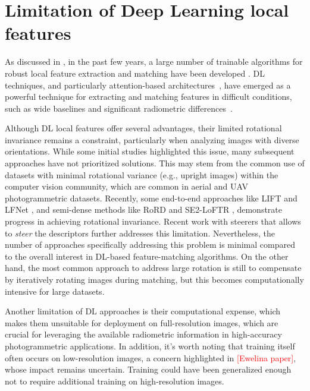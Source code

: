 
\section{Limitation of Deep Learning local features}\label{sec:5:limitation_dl_feats}

As discussed in , in the past few years, a large number of trainable algorithms for robust local feature extraction and matching have been developed \citep{Yao_2021, remondino2022_at_with_dl}.
DL techniques, and particularly attention-based architectures~\citep{vaswani2023attention}, have emerged as a powerful technique for extracting and matching features in difficult conditions, such as wide baselines and significant radiometric differences~\citep{jin_image_2021, Yao_2021}.

Although DL local features offer several advantages, their limited rotational invariance remains a constraint, particularly when analyzing images with diverse orientations. 
While some initial studies highlighted this issue, many subsequent approaches have not prioritized solutions. 
This may stem from the common use of datasets with minimal rotational variance (e.g., upright images) within the computer vision community, which are common in aerial and UAV photogrammetric datasets. 
Recently, some end-to-end approaches like LIFT \citep{yi2016lift} and LFNet \citep{ono2018lfnet}, and semi-dense methods like RoRD \citep{parihar2022rord} and SE2-LoFTR \citep{Bkman2022_se2loftr}, demonstrate progress in achieving rotational invariance. 
Recent work with steerers \citep{Wu2018_steerer} that allows to \textit{steer} the descriptors further addresses this limitation.
Nevertheless, the number of approaches specifically addressing this problem is minimal compared to the overall interest in DL-based feature-matching algorithms.
On the other hand, the most common approach to address large rotation is still to compensate by iteratively rotating images during matching, but this becomes computationally intensive for large datasets.

Another limitation of DL approaches is their computational expense, which makes them unsuitable for deployment on full-resolution images, which are crucial for leveraging the available radiometric information in high-accuracy photogrammetric applications.
In addition, it's worth noting that training itself often occurs on low-resolution images, a concern highlighted in \textcolor{red}{[Ewelina paper]}, whose impact remains uncertain.
Training could have been generalized enough not to require additional training on high-resolution images. 

